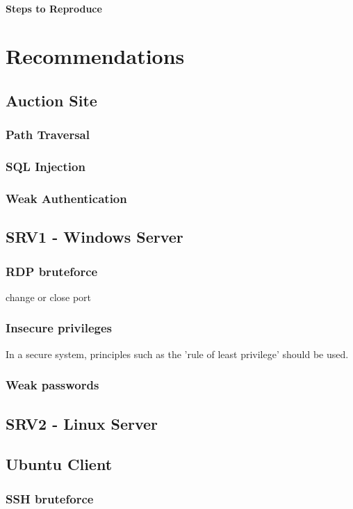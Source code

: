 \documentclass{report}
\begin{document}
\subsubsection{Steps to Reproduce}




\chapter{Recommendations}
\section{Auction Site}
\subsection{Path Traversal}
\subsection{SQL Injection}
\subsection{Weak Authentication}

\section{SRV1 - Windows Server}
\subsection{RDP bruteforce}
	change or close port
\subsection{Insecure privileges}
In a secure system, principles such as the 'rule of least privilege' should be used.
\subsection{Weak passwords}

\section{SRV2 - Linux Server}

\section{Ubuntu Client}
\subsection{SSH bruteforce}
\end{document}
